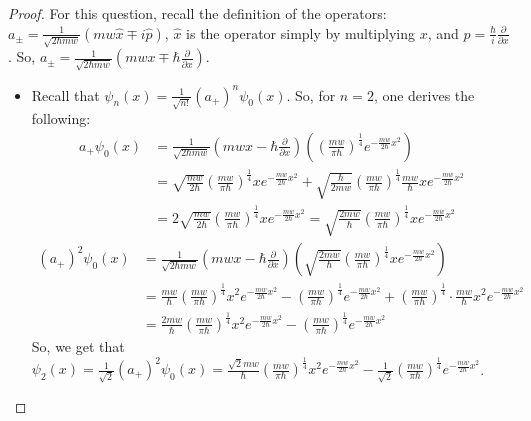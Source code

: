 \documentclass{article}
\begin{document}
\begin{proof}
    For this question, recall the definition of the operators: $a_\pm = \frac{1}{\sqrt{2\hbar mw}}(mw\hat{x} \mp i\hat{p})$, $\hat{x}$ is the operator simply by multiplying $x$, and $\hat{p}=\frac{\hbar}{i}\frac{\partial}{\partial x}$. So, $a_\pm = \frac{1}{\sqrt{2\hbar mw}}(mwx \mp \hbar\frac{\partial}{\partial x})$.

    \begin{itemize}
        \item[(a)] Recall that $\psi_n(x) = \frac{1}{\sqrt{n!}}(a_+)^n \psi_0(x)$. So, for $n=2$,  one derives the following:
        \begin{align}
            a_+ \psi_0(x)&=\frac{1}{\sqrt{2\hbar mw}}\left(mwx - \hbar\frac{\partial}{\partial x}\right)\left(
            \left(\frac{mw}{\pi \hbar}\right)^\frac{1}{4}e^{-\frac{mw}{2\hbar}x^2}\right) \\
            &= \sqrt{\frac{mw}{2\hbar}}\left(\frac{mw}{\pi\hbar}\right)^\frac{1}{4}xe^{-\frac{mw}{2\hbar}x^2} + \sqrt{\frac{\hbar}{2mw}}\left(\frac{mw}{\pi\hbar}\right)^\frac{1}{4}\frac{mw}{\hbar}xe^{-\frac{mw}{2\hbar}x^2}\\
            &= 2\sqrt{\frac{mw}{2\hbar}}\left(\frac{mw}{\pi\hbar}\right)^\frac{1}{4}xe^{-\frac{mw}{2\hbar}x^2} = \sqrt{\frac{2mw}{\hbar}}\left(\frac{mw}{\pi\hbar}\right)^\frac{1}{4}xe^{-\frac{mw}{2\hbar}x^2}
        \end{align}
        \begin{align}
            (a_+)^2\psi_0(x)& = \frac{1}{\sqrt{2\hbar mw}}\left(mwx - \hbar\frac{\partial}{\partial x}\right)\left(\sqrt{\frac{2mw}{\hbar}}\left(\frac{mw}{\pi\hbar}\right)^\frac{1}{4}xe^{-\frac{mw}{2\hbar}x^2}\right)\\
            &= \frac{mw}{\hbar}\left(\frac{mw}{\pi\hbar}\right)^\frac{1}{4}x^2e^{-\frac{mw}{2\hbar}x^2} - \left(\frac{mw}{\pi\hbar}\right)^\frac{1}{4}e^{-\frac{mw}{2\hbar}x^2} + \left(\frac{mw}{\pi\hbar}\right)^\frac{1}{4}\cdot \frac{mw}{\hbar}x^2e^{-\frac{mw}{2\hbar}x^2}\\
            &= \frac{2mw}{\hbar}\left(\frac{mw}{\pi\hbar}\right)^\frac{1}{4}x^2e^{-\frac{mw}{2\hbar}x^2} - \left(\frac{mw}{\pi\hbar}\right)^\frac{1}{4}e^{-\frac{mw}{2\hbar}x^2}
        \end{align}
        So, we get that $\psi_2(x)=\frac{1}{\sqrt{2}}(a_+)^2\psi_0(x) = \frac{\sqrt{2}mw}{\hbar}\left(\frac{mw}{\pi\hbar}\right)^\frac{1}{4}x^2e^{-\frac{mw}{2\hbar}x^2} - \frac{1}{\sqrt{2}}\left(\frac{mw}{\pi\hbar}\right)^\frac{1}{4}e^{-\frac{mw}{2\hbar}x^2}$.


\end{itemize}
\end{proof}
\end{document}
